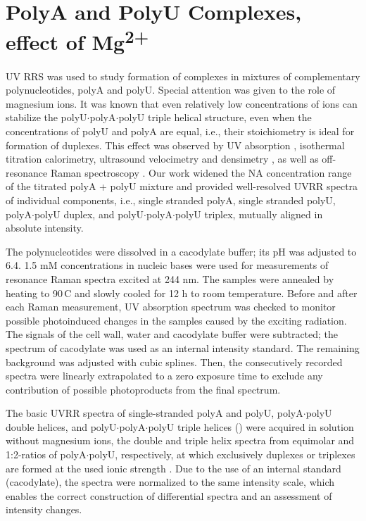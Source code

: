 \section[\texorpdfstring{%
    PolyA and PolyU Complexes, effect of Mg\textsuperscript{2+}
}{%
    PolyA and PolyU Complexes, effect of
		Mg\texttwosuperior\textplussuperior
}]{%
    PolyA and PolyU Complexes, effect of Mg\textsuperscript{2+}
}%

UV RRS was used to study formation of complexes in mixtures of complementary
polynucleotides, polyA and polyU.
Special attention was given to the role of magnesium ions.
It was known that even relatively low concentrations of 
ions can stabilize the polyU$\cdot$polyA$\cdot$polyU triple helical structure,
even when the concentrations of polyU and polyA are equal, i.e., their
stoichiometry is ideal for formation of duplexes.
This effect was observed by UV absorption
\parencite{%
	Kankia2003,%
	Sorokin2003%
},
isothermal titration calorimetry, ultrasound velocimetry and densimetry
\parencite{Kankia2003},
as well as off-resonance Raman spectroscopy
\parencite{Herrera2010}.
Our work widened the NA concentration range of the  titrated
polyA + polyU mixture and provided well-resolved UVRR spectra of individual
components, i.e., single stranded polyA, single stranded polyU,
polyA$\cdot$polyU duplex, and polyU$\cdot$polyA$\cdot$polyU triplex, mutually
aligned in absolute intensity.

The polynucleotides were dissolved in a cacodylate buffer; its pH was adjusted
to 6.4.
1.5 mM concentrations in nucleic bases were used for measurements of resonance
Raman spectra excited at 244 nm.
The samples were annealed by heating to 90\,\textdegree{}C and slowly cooled
for 12 h to room temperature.
Before and after each Raman measurement, UV absorption spectrum was checked to
monitor possible photoinduced changes in the samples caused by the exciting
radiation.
The signals of the cell wall, water and cacodylate buffer were subtracted; the
spectrum of cacodylate was used as an internal intensity standard.
The remaining background was adjusted with cubic splines.
Then, the consecutively recorded spectra were linearly extrapolated to a zero
exposure time to exclude any contribution of possible photoproducts from the
final spectrum.

The basic UVRR spectra of single-stranded polyA and polyU, polyA$\cdot$polyU
double helices, and polyU$\cdot$polyA$\cdot$polyU triple helices
()
were acquired in solution without magnesium ions, the double and triple helix
spectra from equimolar and 1:2-ratios of polyA$\cdot$polyU, respectively, at
which exclusively duplexes or triplexes are formed at the used ionic strength
\parencite{Stevens1964}.
Due to the use of an internal standard (cacodylate), the spectra were
normalized to the same intensity scale, which enables the correct construction
of differential spectra and an assessment of intensity changes.

